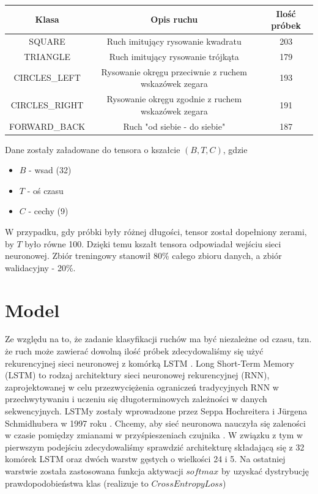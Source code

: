 \documentclass[10pt]{article}
\begin{document}
\pagebreak

\begin{center}

\begin{tabular}{ |c|c|c| } 
  \hline
  Klasa & Opis ruchu & Ilość próbek \\ 
  \hline
  SQUARE & Ruch imitujący rysowanie kwadratu & 203 \\ 
  \hline
  TRIANGLE & Ruch imitujący rysowanie trójkąta & 179 \\ 
  \hline
  CIRCLES\_LEFT & Rysowanie okręgu przeciwnie z ruchem wskazówek zegara & 193 \\
  \hline
  CIRCLES\_RIGHT & Rysowanie okręgu zgodnie z ruchem wskazówek zegara & 191 \\
  \hline
  FORWARD\_BACK & Ruch "od siebie - do siebie" & 187 \\
  \hline
\end{tabular}
\end{center}

Dane zostały załadowane do tensora o kszałcie $(B, T, C)$, gdzie
\begin{itemize}
\item $B$ - wsad (32)
\item $T$ - oś czasu
\item $C$ - cechy (9)
\end{itemize}  

W przypadku, gdy próbki były różnej długości, tensor został dopełniony zerami, by $T$ było równe 100. Dzięki temu kszałt tensora odpowiadał wejściu sieci neuronowej. Zbiór treningowy stanowił 80\% całego zbioru danych, a zbiór walidacyjny - 20\%.

\section{Model}

Ze względu na to, że zadanie klasyfikacji ruchów ma być niezależne od czasu, tzn. że ruch może zawierać dowolną ilość próbek zdecydowaliśmy się użyć rekurencyjnej sieci neuronowej z komórką LSTM \cite{staudemeyer2019understanding}.
Long Short-Term Memory (LSTM) to rodzaj architektury sieci neuronowej rekurencyjnej (RNN), zaprojektowanej w celu przezwyciężenia ograniczeń tradycyjnych RNN w przechwytywaniu i uczeniu się długoterminowych zależności w danych sekwencyjnych. LSTMy zostały wprowadzone przez Seppa Hochreitera i Jürgena Schmidhubera w 1997 roku \cite{hochreiter1997long}. Chcemy, aby sieć neuronowa nauczyła się zaleności w czasie pomiędzy zmianami w przyśpieszeniach czujnika \cite{rivera2017recognition} \cite{ashry2018lstm}. W związku z tym w pierwszym podejściu zdecydowaliśmy sprawdzić architekturę składającą się z 32 komórek LSTM oraz dwóch warstw gęstych o wielkości 24 i 5. Na ostatniej warstwie została zastosowana funkcja aktywacji $softmax$ by uzyskać dystrybucję prawdopodobieństwa klas (realizuje to $CrossEntropyLoss$)
\end{document}
